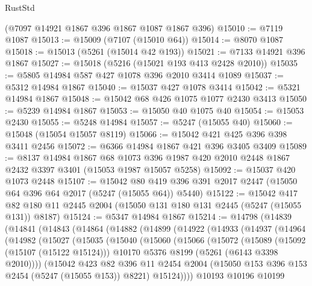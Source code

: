 \begin{lexlean}{RustStd}
\begin{coremodule}
    (@7097 @14921 @1867 @396 @1867 @1087 @1867 @396)
@15010 := @7119 @1087
@15013 := @15009 (@7107 (@15010 @64))
@15014 := @8070 @1087
@15018 := @15013 (@5261 (@15014 @42 @193))
@15021 := @7133 @14921 @396 @1867
@15027 := @15018 (@5216 (@15021 @193 @413 @2428 @2010))
@15035 := @5805 @14984 @587 @427 @1078 @396 @2010 @3414 @1089
@15037 := @5312 @14984 @1867
@15040 := @15037 @427 @1078 @3414
@15042 := @5321 @14984 @1867
@15048 := @15042 @68 @426 @1075 @1077 @2430 @3413
@15050 := @5239 @14984 @1867
@15053 := @15050 @40 @1075 @40
@15054 := @15053 @2430
@15055 := @5248 @14984
@15057 := @5247 (@15055 @40)
@15060 := @15048 (@15054 @15057 @8119)
@15066 := @15042 @421 @425 @396 @398 @3411 @2456
@15072 := @6366 @14984 @1867 @421 @396 @3405 @3409
@15089 := @8137
    @14984
    @1867
    @68
    @1073
    @396
    @1987
    @420
    @2010
    @2448
    @1867
    @2432
    @3397
    @3401
    (@15053 @1987 @15057 @5258)
@15092 := @15037 @420 @1073 @2448
@15107 := @15042
    @80
    @419
    @396
    @391
    @2017
    @2447
    (@15050 @64 @396 @64 @2017 (@5247 (@15055 @64)) @5440)
@15122 := @15042
    @417
    @82
    @180
    @11
    @2445
    @2004
    (@15050 @131 @180 @131 @2445 (@5247 (@15055 @131)) @8187)
@15124 := @5347 @14984 @1867
@15214 := @14798
    (@14839
      (@14841
        (@14843
          (@14864
            (@14882
              (@14899
                (@14922
                  (@14933
                    (@14937
                      (@14964
                        (@14982
                          (@15027
                            (@15035
                              (@15040
                                (@15060
                                  (@15066
                                    (@15072
                                      (@15089
                                        (@15092 (@15107 (@15122 @15124)))
                                        @10170
                                        @5376
                                        @8199
                                        (@5261 (@6143 @3398 @2010))))
                                    (@15042
                                      @423
                                      @82
                                      @396
                                      @11
                                      @2454
                                      @2004
                                      (@15050 @153 @396 @153 @2454 (@5247 (@15055 @153)) @8221)
                                      @15124))))
                              @10193
                              @10196
                              @10199

\end{coremodule}
\end{lexlean}
